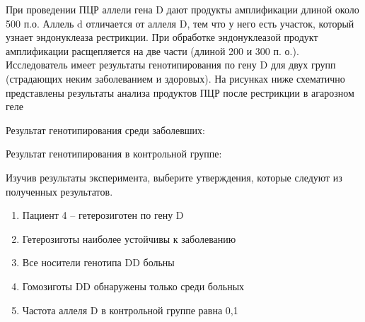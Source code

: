 
При
проведении ПЦР аллели гена D дают
продукты амплификации длиной около 500 п.о. Аллель d отличается от аллеля D,
тем что у него есть участок, который узнает эндонуклеаза рестрикции. При
обработке эндонуклеазой продукт амплификации расщепляется на две части (длиной
200 и 300 п. о.). Исследователь имеет результаты генотипирования по гену D для двух групп (страдающих неким
заболеванием и здоровых). На рисунках ниже схематично представлены результаты
анализа продуктов ПЦР после рестрикции в агарозном геле 

Результат генотипирования среди заболевших:


Результат генотипирования в контрольной
группе:


Изучив результаты эксперимента, выберите
утверждения, которые следуют из полученных результатов.

\begin{enumerate}
    \item Пациент 4 – гетерозиготен по гену D
    \item Гетерозиготы наиболее устойчивы к заболеванию
    \item Все носители генотипа DD больны
    \item Гомозиготы DD обнаружены только среди больных
    \item Частота аллеля D  в контрольной группе равна 0,1
\end{enumerate}

\explanationSection

